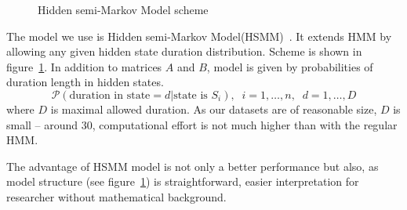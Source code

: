 \documentclass[fleqn,10pt,twoside]{gcb15submission}
\begin{document}
\begin{figure}[h]
\caption{Hidden semi-Markov Model scheme}
\label{fig:hsmm}
\end{figure}

The model we use is Hidden semi-Markov Model(HSMM)~\citep{Yu2010215}. It extends HMM by allowing 
any given hidden state duration distribution. Scheme is shown in figure~\ref{fig:hsmm}.
In addition to matrices $A$ and $B$, model is given by probabilities of duration length in hidden states.
$$\mathcal{P}(\text{duration in state} = d | \text{state is } S_i), \;\; i = 1, \dots, n, \;\; d = 1, \dots, D$$
where $D$ is maximal allowed duration.
As our datasets are of reasonable size, $D$ is small -- around 30, computational effort is not much 
higher than with the regular HMM. 

The advantage of HSMM model is not only a better performance but also, as 
model structure (see figure~\ref{fig:hsmm}) is straightforward, easier interpretation 
for researcher without mathematical background.
\end{document}
